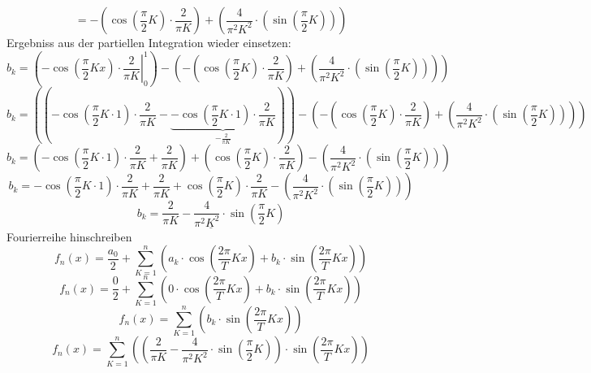 \[ = -\left(\cos\left(\frac{\pi}{2}K\right) \cdot \frac{2}{\pi K}\right) + 
\left(\frac{4}{\pi^2 K^2} \cdot \left(\sin\left(\frac{\pi}{2}K\right)\right)\right) \]
Ergebniss aus der partiellen Integration wieder einsetzen: 
\[ b_k = \left(\left.-\cos\left(\frac{\pi}{2}K x\right) \cdot \frac{2}{\pi K}\right|_0^1 \right) - \left(-\left(\cos\left(\frac{\pi}{2}K\right) \cdot \frac{2}{\pi K}\right) + \left(\frac{4}{\pi^2 K^2} \cdot \left(\sin\left(\frac{\pi}{2}K\right)\right)\right)\right) \]
\[ b_k = \left(\left(-\cos\left(\frac{\pi}{2}K \cdot 1\right) \cdot \frac{2}{\pi K} - \underbrace{-\cos\left(\frac{\pi}{2}K \cdot 1\right) \cdot \frac{2}{\pi K}}_{-\frac{2}{\pi K}}\right) \right)- \left(-\left(\cos\left(\frac{\pi}{2}K\right) \cdot \frac{2}{\pi K}\right) + \left(\frac{4}{\pi^2 K^2} \cdot \left(\sin\left(\frac{\pi}{2}K\right)\right)\right)\right) \]
\[ b_k = \left(-\cos\left(\frac{\pi}{2}K \cdot 1\right) \cdot \frac{2}{\pi K} + \frac{2}{\pi K}\right) + \left(\cos\left(\frac{\pi}{2}K\right) \cdot \frac{2}{\pi K}\right) - \left(\frac{4}{\pi^2 K^2} \cdot \left(\sin\left(\frac{\pi}{2}K\right)\right)\right) \]
\[ b_k = -\cos\left(\frac{\pi}{2}K \cdot 1\right) \cdot \frac{2}{\pi K} + \frac{2}{\pi K} + \cos\left(\frac{\pi}{2}K\right) \cdot \frac{2}{\pi K} - \left(\frac{4}{\pi^2 K^2} \cdot \left(\sin\left(\frac{\pi}{2}K\right)\right)\right) \]
\[ \underline{b_k = \frac{2}{\pi K} - \frac{4}{\pi^2 K^2} \cdot \sin\left(\frac{\pi}{2}K\right)} \]
Fourierreihe hinschreiben
\[ f_n(x) = \frac{a_0}{2} + \sum_{K=1}^{n}\left(a_k \cdot \cos \left(\frac{2 \pi}{T}Kx\right) + b_k \cdot \sin\left(\frac{2 \pi}{T}Kx\right)\right) \]
\[ f_n(x) = \frac{0}{2} + \sum_{K=1}^{n}\left(0 \cdot \cos \left(\frac{2 \pi}{T}Kx\right) + b_k \cdot \sin\left(\frac{2 \pi}{T}Kx\right)\right) \]
\[ f_n(x) = \sum_{K=1}^{n}\left(b_k \cdot \sin\left(\frac{2 \pi}{T}Kx\right)\right) \]
\[ f_n(x) = \sum_{K=1}^{n}\left(\left(\frac{2}{\pi K} - \frac{4}{\pi^2 K^2} \cdot \sin\left(\frac{\pi}{2}K\right)\right) \cdot \sin\left(\frac{2 \pi}{T}Kx\right)\right) \]

